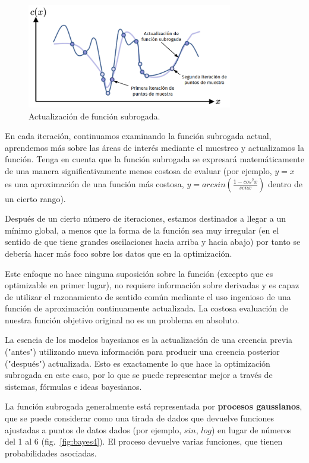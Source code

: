 \documentclass[a4paper,12pt]{article}
\begin{document}
\begin{figure}[H]
	\begin{center}
		\includegraphics[width=0.8\textwidth]{bayes_opt_3_v2.png}
		\caption{Actualización de función subrogada.}
		\label{fig:bayes3}
	\end{center}
\end{figure}

En cada iteración, continuamos examinando la función subrogada actual, aprendemos más sobre las áreas de interés mediante el muestreo y actualizamos la función. Tenga en cuenta que la función subrogada se expresará matemáticamente de una manera significativamente menos costosa de evaluar (por ejemplo, $y=x$ es una aproximación de una función más costosa, $y = arcsin \left( \frac{1-cos^2x}{sen x} \right)$ dentro de un cierto rango).

Después de un cierto número de iteraciones, estamos destinados a llegar a un mínimo global, a menos que la forma de la función sea muy irregular (en el sentido de que tiene grandes oscilaciones hacia arriba y hacia abajo) por tanto se debería hacer más foco sobre los datos que en la optimización.

\clearpage

Este enfoque no hace ninguna suposición sobre la función (excepto que es optimizable en primer lugar), no requiere información sobre derivadas y es capaz de utilizar el razonamiento de sentido común mediante el uso ingenioso de una función de aproximación continuamente actualizada. La costosa evaluación de nuestra función objetivo original no es un problema en absoluto.

La esencia de los modelos bayesianos es la actualización de una creencia previa ("antes") utilizando nueva información para producir una creencia posterior ("después") actualizada. Esto es exactamente lo que hace la optimización subrogada en este caso, por lo que se puede representar mejor a través de sistemas, fórmulas e ideas bayesianos.

La función subrogada generalmente está representada por \textbf{procesos gaussianos}, que se puede considerar como una tirada de dados que devuelve funciones ajustadas a puntos de datos dados (por ejemplo, $sin$, $log$) en lugar de números del 1 al 6 (fig.~\ref{fig:bayes4}). El proceso devuelve varias funciones, que tienen probabilidades asociadas.
\end{document}
